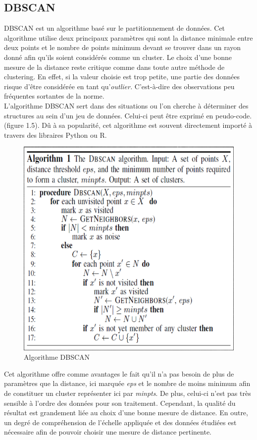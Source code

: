 \documentclass[memoire.tex]{subfiles}
\begin{document}
\newpage
\subsection{DBSCAN}
DBSCAN est un algorithme basé sur le partitionnement de données. Cet algorithme utilise deux principaux paramètres qui sont la distance minimale entre deux points et le nombre de points minimum devant se trouver dans un rayon donné afin qu'ils soient considérés comme un cluster\cite{ref12}. Le choix d'une bonne mesure de la distance reste critique comme dans toute autre méthode de clustering. En effet, si la valeur choisie est trop petite, une partie des données risque d'être considérée en tant qu'\textit {outlier.} C'est-à-dire des observations peu fréquentes sortantes de la norme.\\
L'algorithme DBSCAN sert dans des situations ou l'on cherche à déterminer des structures au sein d'un jeu de données. Celui-ci peut être exprimé en peudo-code.(figure 1.5). Dû à sa popularité, cet algorithme est souvent directement importé à travers des libraires Python ou R.
	\begin{figure}[h!]
		\centerline{\includegraphics[scale=0.5]{img/dbscan.png}}
		\caption{Algorithme DBSCAN}
	\end{figure}
Cet algorithme offre comme avantages le fait qu'il n'a pas besoin de plus de paramètres que la distance, ici marquée \textit{eps} et le nombre de moins minimum afin de constituer un cluster représenter ici par \textit{minpts}. De plus, celui-ci n'est pas très sensible à l'ordre des données pour son traitement. Cependant, la qualité du résultat est grandement liée au choix d'une bonne mesure de distance. En outre, un degré de compréhension de l'échelle appliquée et des données étudiées est nécessaire afin de pouvoir choisir une mesure de distance pertinente.\\
\end{document}
